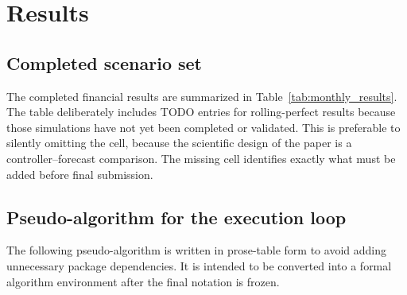 \documentclass[final,5p,times]{elsarticle}
\begin{document}
\section{Results}
\label{sec:results}

\subsection{Completed scenario set}
The completed financial results are summarized in Table~\ref{tab:monthly_results}. The table deliberately includes TODO entries for rolling-perfect results because those simulations have not yet been completed or validated. This is preferable to silently omitting the cell, because the scientific design of the paper is a controller--forecast comparison. The missing cell identifies exactly what must be added before final submission.

\subsection{Pseudo-algorithm for the execution loop}
The following pseudo-algorithm is written in prose-table form to avoid adding unnecessary package dependencies. It is intended to be converted into a formal algorithm environment after the final notation is frozen.
\end{document}
